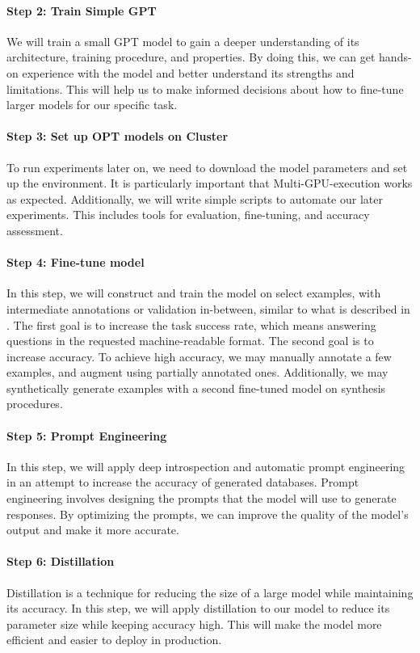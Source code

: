 \documentclass[a4paper,11pt]{article}
\begin{document}
\paragraph{Step 2: Train Simple GPT}
We will train a small GPT model to gain a deeper understanding of its
architecture, training procedure, and properties. By doing this, we can get
hands-on experience with the model and better understand its strengths and
limitations. This will help us to make informed decisions about how to
fine-tune larger models for our specific task.


\paragraph{Step 3: Set up OPT models on Cluster}
To run experiments later on, we need to download the model parameters and set
up the environment. It is particularly important that Multi-GPU-execution works
as expected. Additionally, we will write simple scripts to automate our later
experiments. This includes tools for evaluation, fine-tuning, and accuracy
assessment.


\paragraph{Step 4: Fine-tune model}
In this step, we will construct and train the model on select examples, with
intermediate annotations or validation in-between, similar to what is described
in \cite{dunn_structured_2022}. The first goal is to increase the task success
rate, which means answering questions in the requested machine-readable format.
The second goal is to increase accuracy. To achieve high accuracy, we may
manually annotate a few examples, and augment using partially annotated ones.
Additionally, we may synthetically generate examples with a second fine-tuned
model on synthesis procedures.

\paragraph{Step 5: Prompt Engineering}
In this step, we will apply deep introspection and automatic prompt engineering
\cite{zhou_large_2022} in an attempt to increase the accuracy of generated
databases. Prompt engineering involves designing the prompts that the model
will use to generate responses. By optimizing the prompts, we can improve the
quality of the model's output and make it more accurate.


\paragraph{Step 6: Distillation}
Distillation is a technique for reducing the size of a large model while
maintaining its accuracy. In this step, we will apply distillation
\cite{sun_patient_2019} to our model to reduce its parameter size while keeping
accuracy high. This will make the model more efficient and easier to deploy in
production.
\end{document}
